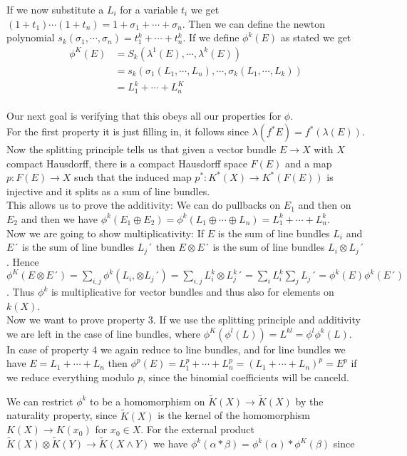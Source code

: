 \documentclass[../Thesis.tex]{subfiles}
\begin{document}
\begin{myproof}
If we now substitute a $L_i$ for a variable $t_i$ we get $(1 + t_1) \cdots ( 1 + t_n) = 1 + \sigma_1 + \cdots + \sigma_n$. Then we can define the newton polynomial $s_k(\sigma_1, \cdots, \sigma_n) = t_1^k + \cdots + t_n^k$. If we define $\phi^k(E)$ as stated we get
\begin{align}
\phi^K(E) &= S_k(\lambda^1(E), \cdots, \lambda^k(E)) \\
          &= s_k(\sigma_1(L_1, \cdots, L_n), \cdots, \sigma_k(L_1, \cdots, L_k)) \\
          &= L_1^k + \cdots + L_n^K
\end{align}
\\Our next goal is verifying that this obeys all our properties for $\phi$.
\\For the first property it is just filling in, it follows since $\lambda(f^*E) = f^*(\lambda(E))$.
\\Now the splitting principle tells us that given a vector bundle $E \rightarrow X$ with $X$ compact Hausdorff, there is a compact Hausdorff space $F(E)$ and a map $p : F(E) \rightarrow X$ such that the induced map $p^*: K^*(X) \rightarrow K^*(F(E))$ is injective and it splits as a sum of line bundles.
\\This allows us to prove the additivity: We can do pullbacks on $E_1$ and then on $E_2$ and then we have $\phi^k(E_1 \oplus E_2) = \phi^k(L_1 \oplus \cdots \oplus L_n) = L_1^k + \cdots + L_n^k$.
\\Now we are going to show multiplicativity: If $E$ is the sum of line bundles $L_i$ and $E´$ is the sum of line bundles $L_j´$ then $E \otimes E´$ is the sum of line bundles $L_i \otimes L_j´$. Hence $\phi^K(E\otimes E´) = \sum_{i,j} \phi^k(L_i, \otimes L_j´ ) = \sum_{i,j} L_i^k \otimes L_j^k´ = \sum_i L_i^k \sum_jL_j´ = \phi^k(E) \phi^k(E´)$. Thus $\phi^k$ is multiplicative for vector bundles and thus also for elements on $k(X)$.
\\Now we want to prove property $3$. If we use the splitting principle and additivity we are left in the case of line bundles, where $\phi^K(\phi^l(L)) = L^{kl} = \phi^l\phi^k(L)$.
\\In case of property $4$ we again reduce to line bundles, and for line bundles we have $E = L_1 + \cdots + L_n$ then $\phi^p(E) = L_1^p + \cdots + L_n^p = (L_1 + \cdots + L_n)^p = E^p$ if we reduce everything modulo $p$, since the binomial coefficients will be canceld.
\end{myproof}
We can restrict $\phi^k$ to be a homomorphism on $\tilde{K}(X) \rightarrow \tilde{K}(X)$ by the naturality property, since $\tilde{K}(X)$ is the kernel of the homomorphism $K(X) \rightarrow K(x_0)$ for $x_0 \in X$. For the external product $\tilde{K}(X) \otimes \tilde{K}(Y) \rightarrow \tilde{K}( X \wedge Y)$ we have $\phi^k(\alpha * \beta) = \phi^k(\alpha) * \phi^K(\beta)$ since
\end{document}
